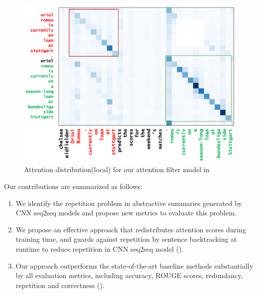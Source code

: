 {\begin{figure}[th!]
\centering
\includegraphics[width=0.9\linewidth]{map3}
\caption{Attention distribution(local) for our attention filter model in }
\label{fig:attn_map3}
\end{figure}
}%

Our contributions are summarized as follows:
\begin{enumerate}
\item We identify the repetition problem in abstractive summaries generated
by CNN seq2seq models and propose new metrics to evaluate this problem.
\item We propose an effective approach that redistributes attention scores 
during training time, and guards against repetition by sentence backtracking
at runtime to reduce repetition in CNN seq2seq model ().
\item Our approach outperforms the state-of-the-art baseline methods 
substantially by all evaluation metrics, including accuracy, ROUGE scores, 
redundancy, repetition and correctness ().
\end{enumerate}

